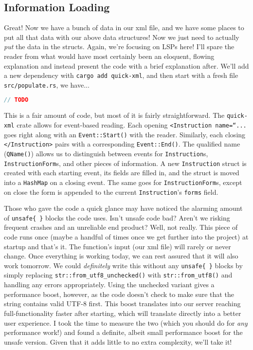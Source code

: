 \subsection{Information Loading}

Great! Now we have a bunch of data in our xml file, and we have some places to put
all that data with our above data structures! Now we just need to actually \textit{put}
the data in the structs. Again, we're focusing on LSPs here! I'll spare the reader
from what would have most certainly been an eloquent, flowing explanation and
instead present the code with a brief explanation after. We'll add a new dependency
with \texttt{cargo add quick-xml}, and then start with a fresh file \texttt{src/populate.rs},
we have...

\begin{lstlisting}[language=rust]
// TODO
\end{lstlisting}

This is a fair amount of code, but most of it is fairly straightforward. The
\texttt{quick-xml} crate allows for event-based reading. Each opening
\texttt{<Instruction name=``...} goes right along with an \texttt{Event::Start()}
with the reader. Similarly, each closing \texttt{</Instruction>} pairs with a
corresponding \texttt{Event::End()}. The qualified name (\texttt{QName()}) allows
us to distinguish between events for \texttt{Instruction}s, \texttt{InstructionForm}s,
and other pieces of information. A new \texttt{Instruction} struct is created with
each starting event, its fields are filled in, and the struct is moved into a
\texttt{HashMap} on a closing event. The same goes for \texttt{InstructionForm}s,
except on close the form is appended to the current \texttt{Instruction}'s
\texttt{forms} field.

Those who gave the code a quick glance may have noticed
the alarming amount of \texttt{unsafe\{ \}} blocks the code uses. Isn't unsafe
code bad? Aren't we risking frequent crashes and an unreliable end product? Well,
not really. This piece of code runs once (maybe a handful of times once we get
further into the project) at startup and that's it. The function's input (our xml
file) will rarely or never change. Once everything is working today, we can rest
assured that it will also work tomorrow. We could \textit{definitely} write this
without any \texttt{unsafe\{ \}} blocks by simply replacing 
\texttt{str::from\_utf8\_unchecked()} with \texttt{str::from\_utf8()} and handling
any errors appropriately. Using the unchecked variant gives a performance boost,
however, as the code doesn't check to make sure that the string contains valid
UTF-8 first. This boost translates into our server reaching full-functionality
faster after starting, which will translate directly into a better user experience.
I took the time to measure the two (which you should do for \textit{any} performance
work!) and found a definite, albeit small performance boost for the unsafe version.
Given that it adds little to no extra complexity, we'll take it!

